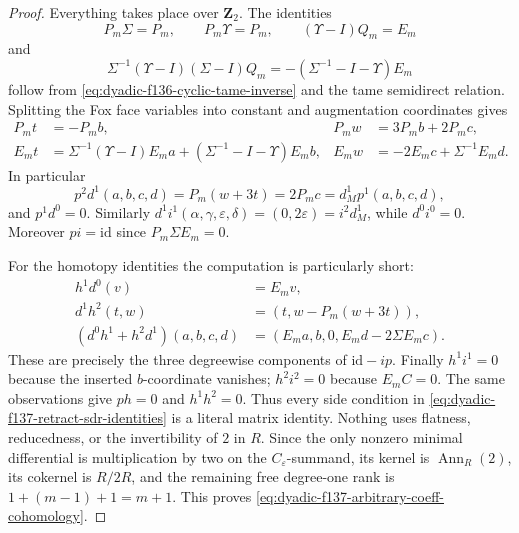 \documentclass[11pt]{article}
\theoremstyle{definition}
\begin{document}
\begin{proof}
Everything takes place over $\mathbf Z_2$.
The identities
\[
P_m\Sigma=P_m,\qquad
P_m\Upsilon=P_m,\qquad
(\Upsilon-I)Q_m=E_m
\]
and
\[
\Sigma^{-1}(\Upsilon-I)(\Sigma-I)Q_m
=-(\Sigma^{-1}-I-\Upsilon)E_m
\]
follow from
\eqref{eq:dyadic-f136-cyclic-tame-inverse}
and the tame semidirect relation.
Splitting the Fox face variables into constant
and augmentation coordinates gives
\begin{equation}\label{eq:dyadic-f137-face-components}
\begin{aligned}
P_mt&=-P_mb,&
P_mw&=3P_mb+2P_mc,\\
E_mt&=\Sigma^{-1}(\Upsilon-I)E_ma+
       (\Sigma^{-1}-I-\Upsilon)E_mb,&
E_mw&=-2E_mc+\Sigma^{-1}E_md .
\end{aligned}
\end{equation}
In particular
\[
p^2d^1(a,b,c,d)=P_m(w+3t)=2P_mc
=d_M^1p^1(a,b,c,d),
\]
and $p^1d^0=0$.  Similarly
$d^1i^1(\alpha,\gamma,\varepsilon,\delta)
=(0,2\varepsilon)=i^2d_M^1$, while
$d^0i^0=0$.  Moreover $pi=\mathrm{id}$
since $P_m\Sigma E_m=0$.

For the homotopy identities the computation is
particularly short:
\begin{equation}\label{eq:dyadic-f137-three-homotopy-rows}
\begin{aligned}
h^1d^0(v)&=E_mv,\\
d^1h^2(t,w)&=(t,w-P_m(w+3t)),\\
(d^0h^1+h^2d^1)(a,b,c,d)
  &=(E_ma,b,0,E_md-2\Sigma E_mc).
\end{aligned}
\end{equation}
These are precisely the three degreewise
components of $\mathrm{id}-ip$.
Finally $h^1i^1=0$ because the inserted
$b$-coordinate vanishes; $h^2i^2=0$
because $E_mC=0$.  The same observations
give $ph=0$ and $h^1h^2=0$.
Thus every side condition in
\eqref{eq:dyadic-f137-retract-sdr-identities}
is a literal matrix identity.  Nothing uses
flatness, reducedness, or the invertibility
of $2$ in $R$.
Since the only nonzero minimal differential
is multiplication by two on the
$C_\varepsilon$-summand, its kernel is
$\operatorname{Ann}_R(2)$, its cokernel is
$R/2R$, and the remaining free
degree-one rank is $1+(m-1)+1=m+1$.
This proves
\eqref{eq:dyadic-f137-arbitrary-coeff-cohomology}.
\end{proof}
\end{document}
